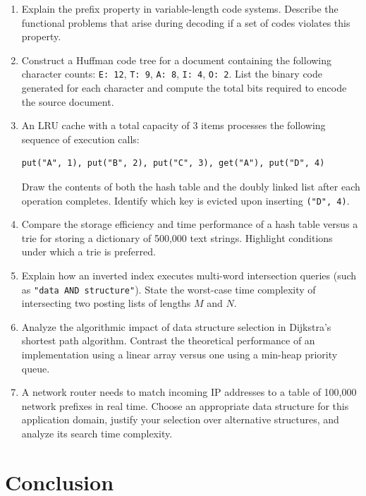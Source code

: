 \documentclass[12pt]{report}
\begin{document}
\begin{enumerate}
    \item Explain the prefix property in variable-length code systems. Describe the functional problems that arise during decoding if a set of codes violates this property.
    \item Construct a Huffman code tree for a document containing the following character counts: \texttt{E: 12}, \texttt{T: 9}, \texttt{A: 8}, \texttt{I: 4}, \texttt{O: 2}. List the binary code generated for each character and compute the total bits required to encode the source document.
    \item An LRU cache with a total capacity of 3 items processes the following sequence of execution calls:
\begin{verbatim}
put("A", 1), put("B", 2), put("C", 3), get("A"), put("D", 4)
\end{verbatim}
    Draw the contents of both the hash table and the doubly linked list after each operation completes. Identify which key is evicted upon inserting \texttt{("D", 4)}.
    \item Compare the storage efficiency and time performance of a hash table versus a trie for storing a dictionary of 500,000 text strings. Highlight conditions under which a trie is preferred.
    \item Explain how an inverted index executes multi-word intersection queries (such as \texttt{"data AND structure"}). State the worst-case time complexity of intersecting two posting lists of lengths $M$ and $N$.
    \item Analyze the algorithmic impact of data structure selection in Dijkstra's shortest path algorithm. Contrast the theoretical performance of an implementation using a linear array versus one using a min-heap priority queue.
    \item A network router needs to match incoming IP addresses to a table of 100,000 network prefixes in real time. Choose an appropriate data structure for this application domain, justify your selection over alternative structures, and analyze its search time complexity.
\end{enumerate}

\section*{Conclusion}
\end{document}
